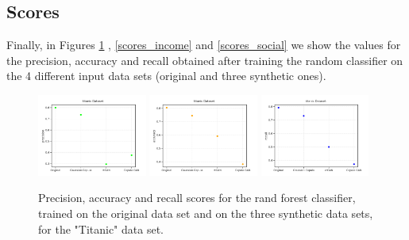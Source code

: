 \documentclass{article}
\begin{document}
\subsection{Scores}
Finally, in Figures \ref{scores_titanic} , \ref{scores_income} and \ref{scores_social} we show the values for the precision, accuracy and recall obtained after training the random classifier on the 4 different input data sets (original and three synthetic ones).


\begin{figure}[h!]
	\centering
	\includegraphics[width=0.32\textwidth]{../plots/results/titanic_precision.png}
	\includegraphics[width=0.32\textwidth]{../plots/results/titanic_accuracy.png}
	\includegraphics[width=0.32\textwidth]{../plots/results/titanic_recall.png}

	\caption{Precision, accuracy and recall scores for the rand forest classifier, trained on the original data set and on the three synthetic data sets, for the "Titanic" data set.}
	\label{scores_titanic}
\end{figure}
\end{document}
